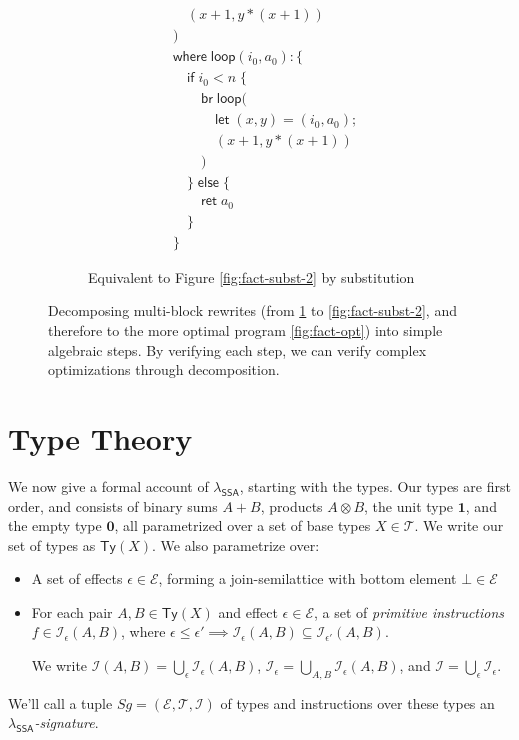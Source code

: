 \documentclass[acmsmall,screen,review]{acmart}
\newcounter{todos}
\newcommand{\TODO}[1]{{
  \stepcounter{todos}
  \begin{center}\large{\textcolor{red}{\textbf{TODO \arabic{todos}:} #1}}\end{center}
}}
\newcommand{\mc}[1]{\ensuremath{\mathcal{#1}}}
\newcommand{\mb}[1]{\ensuremath{\mathbf{#1}}}
\newcommand{\ms}[1]{\ensuremath{\mathsf{#1}}}
\newcommand{\isotopessa}{\(\lambda_{\ms{SSA}}\)}
\begin{document}
\begin{figure}
\begin{subfigure}[c]{.5\textwidth}
\begin{align*}
      & \quad(x + 1, y * (x + 1)) \\
      & ) \\
      & \ms{where}\;\ms{loop}(i_0, a_0): \{\\
      & \quad \ms{if}\;i_0 < n\;\{ \\
      & \qquad \ms{br}\;\ms{loop}( \\
      & \qquad \quad \ms{let}\;(x, y) = (i_0, a_0); \\
      & \qquad \quad (x + 1, y * (x + 1)) \\ 
      & \qquad ) \\
      & \quad \}\;\ms{else}\;\{ \\
      & \qquad \ms{ret}\;a_0 \\
      & \quad \} \\
      & \}
    \end{align*}
    \caption{Equivalent to Figure \ref{fig:fact-subst-2} by substitution}
    \label{fig:fact-zero}
  \end{subfigure}
  \caption{
    Decomposing multi-block rewrites (from \ref{fig:fact-zero} to
    \ref{fig:fact-subst-2}, and therefore to the more optimal program 
    \ref{fig:fact-opt}) into simple algebraic steps. By verifying each step, we can
    verify complex optimizations through decomposition.
  } 
  \Description{}
  \label{fig:fact-dinat-rewrites}
\end{figure}

\section{Type Theory}

\label{sec:typing}

We now give a formal account of \isotopessa{}, starting with the types. Our types are first order,
and consists of binary sums $A + B$, products $A \otimes B$, the unit type $\mathbf{1}$, and the
empty type $\mb{0}$, all parametrized over a set of base types $X \in \mc{T}$. We write our set of
types as $\ms{Ty}(X)$. We also parametrize over:
\begin{itemize}
  
  \item A set of effects $\epsilon \in \mc{E}$, forming a join-semilattice with bottom element $\bot
  \in \mc{E}$
  
  \item For each pair $A, B \in \ms{Ty}(X)$ and effect $\epsilon \in \mc{E}$, a
  set of \textit{primitive instructions} $f \in \mc{I}_\epsilon(A, B)$, where
  $\epsilon \leq \epsilon' \implies \mc{I}_\epsilon(A, B) \subseteq
  \mc{I}_{\epsilon'}(A, B)$. 
  
  We write $\mc{I}(A, B) = \bigcup_\epsilon\mc{I}_\epsilon(A, B)$,
  $\mc{I}_\epsilon = \bigcup_{A, B}\mc{I}_\epsilon(A, B)$, and $\mc{I} =
  \bigcup_\epsilon\mc{I}_\epsilon$.

\end{itemize}
We'll call a tuple $Sg = (\mc{E}, \mc{T}, \mc{I})$ of types and instructions over these types an
\emph{\isotopessa{}-signature}.
\end{document}
